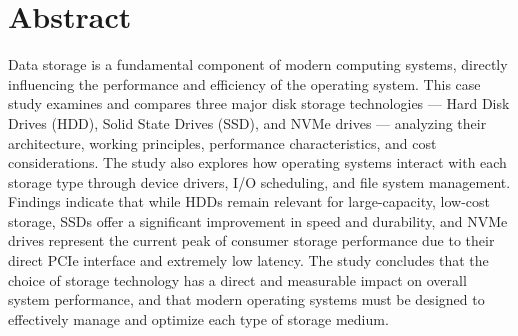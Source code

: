 \section*{Abstract}

Data storage is a fundamental component of modern computing systems, directly influencing the 
performance and efficiency of the operating system. This case study examines and compares three 
major disk storage technologies — Hard Disk Drives (HDD), Solid State Drives (SSD), and NVMe 
drives — analyzing their architecture, working principles, performance characteristics, and cost 
considerations. The study also explores how operating systems interact with each storage type 
through device drivers, I/O scheduling, and file system management. Findings indicate that while 
HDDs remain relevant for large-capacity, low-cost storage, SSDs offer a significant improvement in 
speed and durability, and NVMe drives represent the current peak of consumer storage performance due 
to their direct PCIe interface and extremely low latency. The study concludes that the choice of 
storage technology has a direct and measurable impact on overall system performance, and that modern 
operating systems must be designed to effectively manage and optimize each type of storage medium.